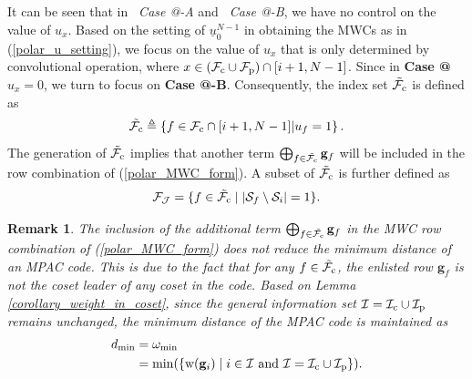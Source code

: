 \documentclass[12pt, draftclsnofoot, peerreview, onecolumn]{IEEEtran}
\makeatletter
\theoremstyle{noparent}
\newtheorem{remark}[theorem]{\textbf{Remark}}
\newcommand{\Rmnum}[1]{\expandafter\@slowromancap\romannumeral #1@}
\makeatother
\begin{document}
It can be seen that in \textit{\ Case \Rmnum{1}-A} and \textit{\ Case \Rmnum{1}-B}, we have no control on the 
value of $u_x$.
Based on the setting of $\underline{u}_{0}^{N-1}$ in obtaining the MWCs as
in (\ref{polar_u_setting}), we focus on the value of $u_x$
that is only determined by convolutional operation, where $x\in (\mathcal{F}_{\rm c}\cup\mathcal{F}_{\rm p})\cap[i+1, N-1]$.
Since in \textbf{Case \Rmnum{3}} $u_x=0$,
we turn to focus on \textbf{Case \Rmnum{1}-B}.
Consequently, the index set $\tilde{\mathcal{F}_{\rm c}}$ is defined as 
\begin{equation}
    \label{F_c_piao}
\tilde{\mathcal{F}_{\rm c}}  \triangleq \left\{f \in \mathcal{F}_{\rm c} \cap [i+1, N-1] | u_f=1\right\}.
\end{equation}
The generation of $\tilde{\mathcal{F}_{\rm c}}$ implies that 
another term $\bigoplus_{f \in \tilde{\mathcal{F}_{\rm c}}} \mathbf{g}_f$ 
will be included in the row combination of (\ref{polar_MWC_form}).
A subset of $\tilde{\mathcal{F}_{\rm c}}$ 
is further defined as
\begin{equation}
\label{F_J}
\mathcal{F}_{\mathcal{J}}=\{f \in \tilde{\mathcal{F}_{\rm c}}  \mid  \left|\mathcal{S}_f \setminus \mathcal{S}_i\right|=1 \}.
\end{equation}




\begin{remark}
    \label{remark_7}
    The inclusion of the additional term $\bigoplus_{f \in \tilde{\mathcal{F}_{\rm c}}} \mathbf{g}_f$ 
    in the MWC row combination of (\ref{polar_MWC_form}) 
    does not reduce the minimum distance of an MPAC code.
    This is due to the fact that for any $f \in \tilde{\mathcal{F}_{\rm c}}$, 
    the enlisted row $\mathbf{g}_f$ is not the coset leader of any coset in the code.
    Based on Lemma \ref{corollary_weight_in_coset}, 
    since the general information set $\mathcal{I}=\mathcal{I}_{\rm c}\cup\mathcal{I}_{\rm p}$ remains unchanged,
    the minimum distance of the MPAC code is maintained as
    \begin{equation}
        \label{dmin_MPAC}
    \begin{aligned}        
        d_{\min}&=\omega_{\min}\\&=\min(\{{{\rm w}(\mathbf{g}_i}) \mid  i\in \mathcal{I}\ \text{and}\ \mathcal{I}=\mathcal{I}_{\rm c}\cup\mathcal{I}_{\rm p}\}).
    \end{aligned}
\end{equation}
\end{remark}
\end{document}
